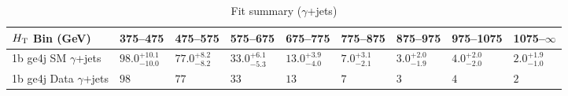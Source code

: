 \documentclass[8pt]{article}
\def\scalht{\mbox{$H_{\rm{T}}$}\xspace}
\newcommand\T{\rule{0pt}{2.6ex}}
\begin{document}
\begin{table}[ht!]
\caption{Fit summary ($\gamma$+jets)}
\label{tab:ensemble-summary}
\centering
\begin{tabular}{ lllllllll }

\hline
\scalht Bin (GeV)       & 375--475                       & 475--575                       & 575--675                       & 675--775                       & 775--875                       & 875--975                       & 975--1075                      & 1075--$\infty$                 \\ [1.000000ex]
\hline
1b ge4j SM $\gamma$+jets\T & $98.0^{+10.1}_{-10.0}$         & $77.0^{+8.2}_{-8.2}$           & $33.0^{+6.1}_{-5.3}$           & $13.0^{+3.9}_{-4.0}$           & $7.0^{+3.1}_{-2.1}$            & $3.0^{+2.0}_{-1.9}$            & $4.0^{+2.0}_{-2.0}$            & $2.0^{+1.9}_{-1.0}$            \\ 
1b ge4j Data $\gamma$+jets\T & $98$                           & $77$                           & $33$                           & $13$                           & $7$                            & $3$                            & $4$                            & $2$                            \\ 
\hline

\end{tabular}
\end{table}
\end{document}

